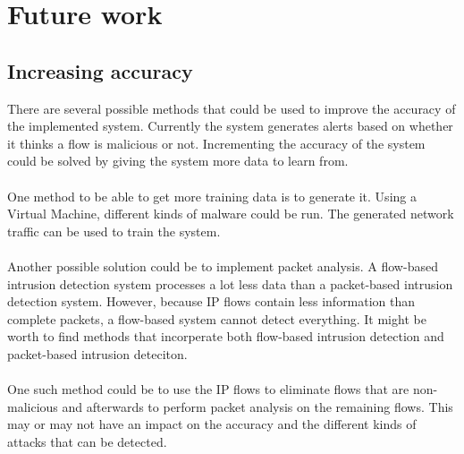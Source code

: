 
\chapter{Future work} %
\label{prevention} %

\section{Increasing accuracy}
There are several possible methods that could be used to improve the accuracy of the implemented  system. Currently the system generates alerts based on whether it thinks a flow is malicious or not. Incrementing the accuracy of the system could be solved by giving the system more data to learn from. \\
\\
One method to be able to get more training data is to generate it. Using a Virtual Machine, different kinds of malware could be run. The generated network traffic can be used to train the system. \\
\\
Another possible solution could be to implement packet analysis. A flow-based intrusion detection system processes a lot less data than a packet-based intrusion detection system. However, because IP flows contain less information than complete packets, a flow-based system cannot detect everything. It might be worth to find methods that incorperate both flow-based intrusion detection and packet-based intrusion deteciton. \\
\\
One such method could be to use the IP flows to eliminate flows that are non-malicious and afterwards to perform packet analysis on the remaining flows. This may or may not have an impact on the accuracy and the different kinds of attacks that can be detected.

